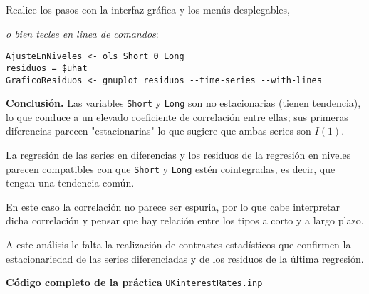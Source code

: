 \documentclass[11pt]{article}
\begin{document}
Realice los pasos con la interfaz gráfica y los menús desplegables,
{\vspace{0pt} \footnotesize \color{gray!70!black}
\emph{o bien teclee en linea de comandos}:
\begin{verbatim}
AjusteEnNiveles <- ols Short 0 Long
residuos = $uhat
GraficoResiduos <- gnuplot residuos --time-series --with-lines
\end{verbatim}
}


\textbf{Conclusión.} Las variables \texttt{Short} y \texttt{Long} son no estacionarias
(tienen tendencia), lo que conduce a un elevado coeficiente de
correlación entre ellas; sus primeras diferencias parecen
"estacionarias" lo que sugiere que ambas series son \(I(1)\).

La regresión de las series en diferencias y los residuos de la
regresión en niveles parecen compatibles con que \texttt{Short} y \texttt{Long}
estén cointegradas, es decir, que tengan una tendencia común.

En este caso la correlación no parece ser espuria, por lo que cabe
interpretar dicha correlación y pensar que hay relación entre los
tipos a corto y a largo plazo.

A este análisis le falta la realización de contrastes estadísticos que
confirmen la estacionariedad de las series diferenciadas y de los
residuos de la última regresión.

\vspace{10pt}
\noindent
\textbf{Código completo de la práctica} \texttt{UKinterestRates.inp}

\vspace{10pt}

\clearpage
\end{document}
